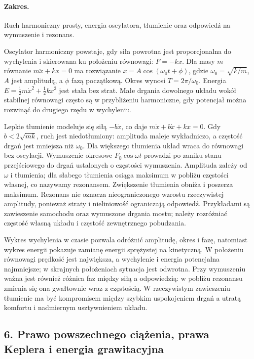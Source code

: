 \documentclass[11pt,a4paper]{article}
\begin{document}
\paragraph{Zakres.} Ruch harmoniczny prosty, energia oscylatora, tłumienie oraz odpowiedź na wymuszenie i rezonans.

Oscylator harmoniczny powstaje, gdy siła powrotna jest proporcjonalna do wychylenia i skierowana ku położeniu równowagi: $F=-kx$. Dla masy $m$ równanie $m\ddot x+kx=0$ ma rozwiązanie $x=A\cos(\omega_0t+\phi)$, gdzie $\omega_0=\sqrt{k/m}$, $A$ jest amplitudą, a $\phi$ fazą początkową. Okres wynosi $T=2\pi/\omega_0$. Energia $E=\tfrac12m\dot x^2+\tfrac12kx^2$ jest stała bez strat. Małe drgania dowolnego układu wokół stabilnej równowagi często są w przybliżeniu harmoniczne, gdy potencjał można rozwinąć do drugiego rzędu w wychyleniu.

Lepkie tłumienie modeluje się siłą $-b\dot x$, co daje $m\ddot x+b\dot x+kx=0$. Gdy $b<2\sqrt{mk}$, ruch jest niedotłumiony: amplituda maleje wykładniczo, a częstość drgań jest mniejsza niż $\omega_0$. Dla większego tłumienia układ wraca do równowagi bez oscylacji. Wymuszenie okresowe $F_0\cos\omega t$ prowadzi po zaniku stanu przejściowego do drgań ustalonych o częstości wymuszenia. Amplituda zależy od $\omega$ i tłumienia; dla słabego tłumienia osiąga maksimum w pobliżu częstości własnej, co nazywamy rezonansem. Zwiększenie tłumienia obniża i poszerza maksimum. Rezonans nie oznacza nieograniczonego wzrostu rzeczywistej amplitudy, ponieważ straty i nieliniowość ograniczają odpowiedź. Przykładami są zawieszenie samochodu oraz wymuszone drgania mostu; należy rozróżniać częstość własną układu i częstość zewnętrznego pobudzania.

Wykres wychylenia w czasie pozwala odróżnić amplitudę, okres i fazę, natomiast wykres energii pokazuje zamianę energii sprężystej na kinetyczną. W położeniu równowagi prędkość jest największa, a wychylenie i energia potencjalna najmniejsze; w skrajnych położeniach sytuacja jest odwrotna. Przy wymuszeniu ważna jest również różnica faz między siłą a odpowiedzią: w pobliżu rezonansu zmienia się ona gwałtownie wraz z częstością. W rzeczywistym zawieszeniu tłumienie ma być kompromisem między szybkim uspokojeniem drgań a utratą komfortu i nadmiernym usztywnieniem układu.

\subsection{6. Prawo powszechnego ciążenia, prawa Keplera i energia grawitacyjna}
\end{document}
